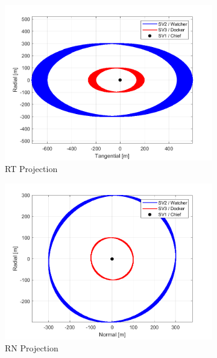\begin{figure}[H]
    \centering
    \begin{subfigure}[b]{0.32\linewidth}
        \includegraphics[width=\linewidth]{sim/figures/PS5/mode_2_RTN.png_RT.png}
        \caption{RT Projection}
        \label{fig:mode_2_rt}
    \end{subfigure}
    \begin{subfigure}[b]{0.32\linewidth}
        \includegraphics[width=\linewidth]{sim/figures/PS5/mode_2_RTN.png_RN.png}
        \caption{RN Projection}
        \label{fig:mode_2_rn}
    \end{subfigure}
    \begin{subfigure}[b]{0.32\linewidth}

\end{subfigure}
\end{figure}
